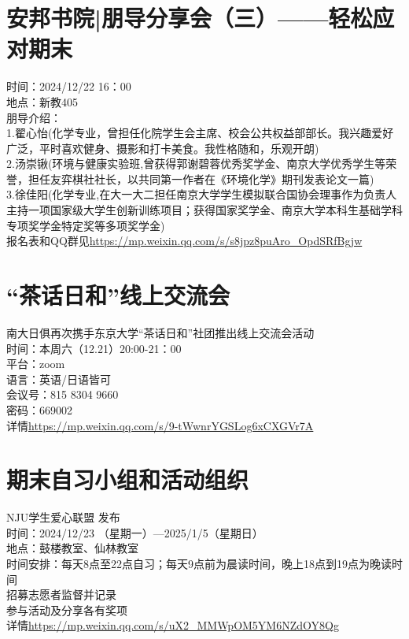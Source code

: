 \documentclass[letterpaper, 12pt]{article}
\begin{document}
\begin{multicols}{2}
\section{安邦书院|朋导分享会（三）——轻松应对期末}
时间：2024/12/22  16：00\\
地点：新教405\\
朋导介绍：\\
1.翟心怡(化学专业，曾担任化院学生会主席、校会公共权益部部长。我兴趣爱好广泛，平时喜欢健身、摄影和打卡美食。我性格随和，乐观开朗)\\
2.汤崇锹(环境与健康实验班,曾获得郭谢碧蓉优秀奖学金、南京大学优秀学生等荣誉，担任友弈棋社社长，以共同第一作者在《环境化学》期刊发表论文一篇)\\
3.徐佳阳(化学专业,在大一大二担任南京大学学生模拟联合国协会理事作为负责人主持一项国家级大学生创新训练项目；获得国家奖学金、南京大学本科生基础学科专项奖学金特定奖等多项奖学金)\\
报名表和QQ群见\url{https://mp.weixin.qq.com/s/s8jpz8puAro_OpdSRfBgjw}

\section{“茶话日和”线上交流会}
南大日俱再次携手东京大学“茶话日和”社团推出线上交流会活动\\
时间：本周六（12.21）20:00-21：00\\
平台：zoom\\
语言：英语/日语皆可\\
会议号：815 8304 9660\\
密码：669002\\
详情\url{https://mp.weixin.qq.com/s/9-tWwnrYGSLog6xCXGVr7A}\\

\section{期末自习小组和活动组织}
NJU学生爱心联盟 发布\\
时间：2024/12/23 （星期一）—2025/1/5（星期日）\\
地点：鼓楼教室、仙林教室\\
时间安排：每天8点至22点自习；每天9点前为晨读时间，晚上18点到19点为晚读时间\\
招募志愿者监督并记录\\
参与活动及分享各有奖项\\
详情\url{https://mp.weixin.qq.com/s/uX2_MMWpOM5YM6NZdOY8Qg}\\




\end{multicols}
\end{document}
